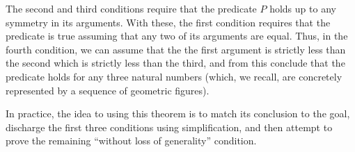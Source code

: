 The second and third conditions require that the predicate $P$ holds up to any symmetry in its arguments. With these, the first condition requires that the predicate is true assuming that any two of its arguments are equal. Thus, in the fourth condition, we can assume that the the first argument is strictly less than the second which is strictly less than the third, and from this conclude that the predicate holds for any three natural numbers (which, we recall, are concretely represented by a sequence of geometric figures). 

In practice, the idea to using this theorem is to match its conclusion to the goal, discharge the first three conditions using simplification, and then attempt to prove the remaining ``without loss of generality'' condition.



